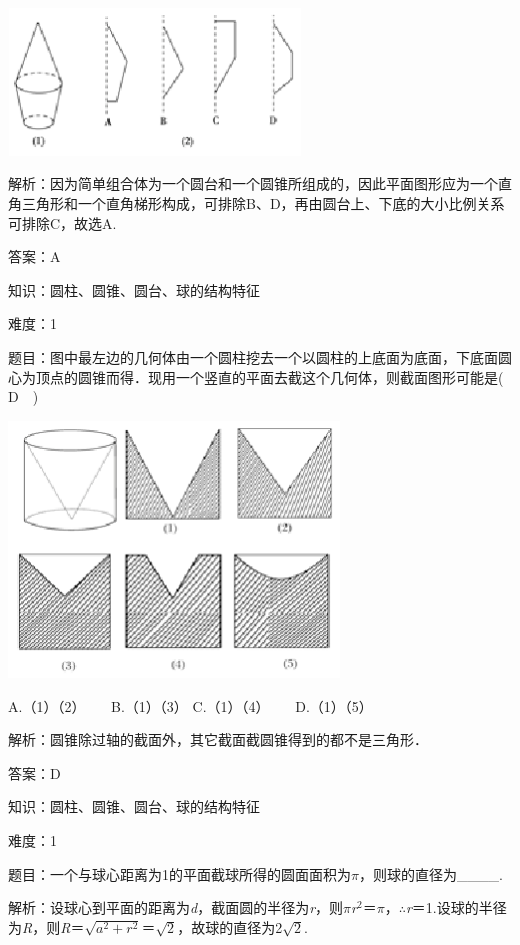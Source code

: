 \documentclass{article} %
\begin{document}
\includegraphics*[width=3.06in, height=1.54in, keepaspectratio=false]{image17}

解析：因为简单组合体为一个圆台和一个圆锥所组成的，因此平面图形应为一个直角三角形和一个直角梯形构成，可排除B、D，再由圆台上、下底的大小比例关系可排除C，故选A.

答案：A

知识：圆柱、圆锥、圆台、球的结构特征

难度：1

题目：图中最左边的几何体由一个圆柱挖去一个以圆柱的上底面为底面，下底面圆心为顶点的圆锥而得．现用一个竖直的平面去截这个几何体，则截面图形可能是(　D　)

\includegraphics*[width=3.46in, height=2.68in, keepaspectratio=false]{image18}

A.（1）（2）　　 B.（1）（3） C.（1）（4）　　 D.（1）（5）

解析：圆锥除过轴的截面外，其它截面截圆锥得到的都不是三角形．

答案：D

知识：圆柱、圆锥、圆台、球的结构特征

难度：1

题目：一个与球心距离为1的平面截球所得的圆面面积为$\pi$，则球的直径为\_\_\_\_.

解析：设球心到平面的距离为\textit{d}，截面圆的半径为\textit{r}，则$\pi$\textit{r}${}^{2}$＝$\pi$，$\mathrm{\therefore}$\textit{r}＝1.设球的半径为\textit{R}，则\textit{R}＝$\sqrt{a^2+r^2}$＝$\sqrt{2}$，故球的直径为2$\sqrt{2}$.
\end{document}
